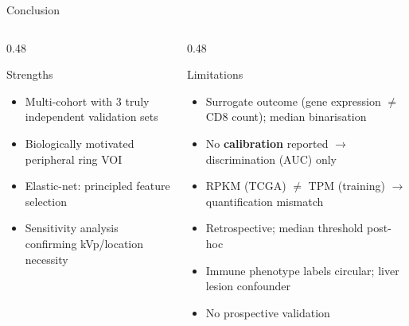 \documentclass[aspectratio=1610]{beamer}
\begin{document}

\begin{frame}{Conclusion}
    \begin{columns}[T]
        \begin{column}{0.48\textwidth}
            \begin{exampleblock}{Strengths}
                \begin{itemize}
                    \item Multi-cohort with 3 truly independent validation sets
                    \item Biologically motivated peripheral ring VOI
                    \item Elastic-net: principled feature selection
                    \item Sensitivity analysis confirming kVp/location necessity
                \end{itemize}
            \end{exampleblock}
        \end{column}
        \begin{column}{0.48\textwidth}
            \begin{alertblock}{Limitations}
                \begin{itemize}
                    \item Surrogate outcome (gene expression $\neq$ CD8 count); median binarisation
                    \item No \textbf{calibration} reported $\rightarrow$ discrimination (AUC) only
                    \item RPKM (TCGA) $\neq$ TPM (training) $\rightarrow$ quantification mismatch
                    \item Retrospective; median threshold post-hoc
                    \item Immune phenotype labels circular; liver lesion confounder
                    \item No prospective validation
                \end{itemize}
            \end{alertblock}
        \end{column}
    \end{columns}
\end{frame}
\end{document}
